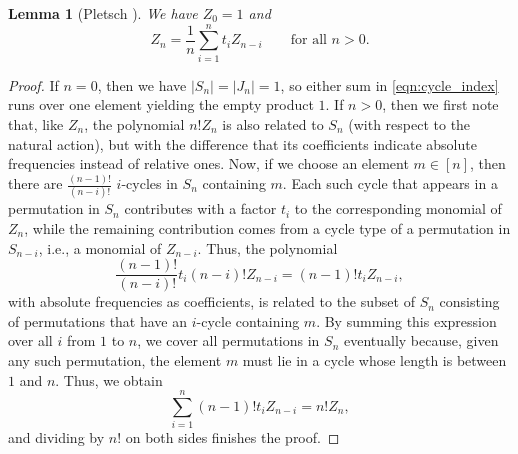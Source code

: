 \documentclass[12pt]{article}
\newtheorem{lemma}[theorem]{Lemma}
\theoremstyle{definition}
\theoremstyle{remark}
\begin{document}
	\begin{lemma}[Pletsch \cite{P}]
		We have $Z_0 = 1$ and
		\[
		Z_n = \frac1n\sum_{i=1}^n t_i Z_{n-i} \qquad \text{for all }n>0.
		\]
	\end{lemma}
	\begin{proof}
		If $n=0$, then we have $\lvert S_n\rvert = \lvert J_n\rvert = 1$, so either sum in \eqref{eqn:cycle_index} runs over one element yielding the empty product $1$. If $n>0$, then we first note that, like $Z_n$, the polynomial $n!Z_n$ is also related to $S_n$ (with respect to the natural action), but with the difference that its coefficients indicate absolute frequencies instead of relative ones. Now, if we choose an element $m\in [n]$, then there are $\frac{(n-1)!}{(n-i)!}$ $i$-cycles in $S_n$ containing $m$. Each such cycle that appears in a permutation in $S_n$ contributes with a factor $t_i$ to the corresponding monomial of $Z_n$, while the remaining contribution comes from a cycle type of a permutation in $S_{n-i}$, i.e., a monomial of $Z_{n-i}$. Thus, the polynomial
		\[
		\frac{(n-1)!}{(n-i)!}t_i(n-i)!Z_{n-i} = (n-1)!t_iZ_{n-i},
		\]
		with absolute frequencies as coefficients, is related to the subset of $S_n$ consisting of permutations that have an $i$-cycle containing $m$. By summing this expression over all $i$ from $1$ to $n$, we cover all permutations in $S_n$ eventually because, given any such permutation, the element $m$ must lie in a cycle whose length is between $1$ and $n$. Thus, we obtain
		\[
		\sum_{i=1}^n (n-1)!t_iZ_{n-i} = n!Z_n,
		\]
		and dividing by $n!$ on both sides finishes the proof.
	\end{proof}
	
\end{document}
